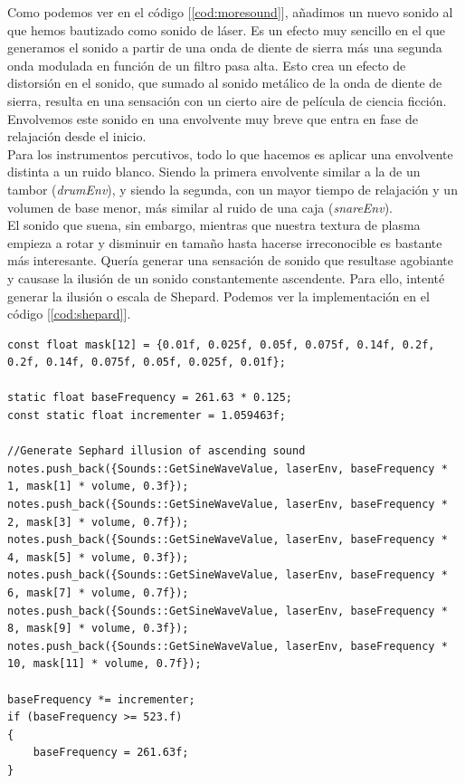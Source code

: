 Como podemos ver en el código [\ref{cod:moresound}], añadimos un nuevo sonido al que hemos bautizado como sonido de láser. Es un efecto muy sencillo en el que generamos el sonido a partir de una onda de diente de sierra más una segunda onda modulada en función de un filtro pasa alta. Esto crea un efecto de distorsión en el sonido, que sumado al sonido metálico de la onda de diente de sierra, resulta en una sensación con un cierto aire de película de ciencia ficción. Envolvemos este sonido en una envolvente muy breve que entra en fase de relajación desde el inicio.\\

Para los instrumentos percutivos, todo lo que hacemos es aplicar una envolvente distinta a un ruido blanco. Siendo la primera envolvente similar a la de un tambor (\emph{drumEnv}), y siendo la segunda, con un mayor tiempo de relajación y un volumen de base menor, más similar al ruido de una caja (\emph{snareEnv}).\\

El sonido que suena, sin embargo, mientras que nuestra textura de plasma empieza a rotar y disminuir en tamaño hasta hacerse irreconocible es bastante más interesante. Quería generar una sensación de sonido que resultase agobiante y causase la ilusión de un sonido constantemente ascendente. Para ello, intenté generar la ilusión o escala de Shepard. Podemos ver la implementación en el código [\ref{cod:shepard}].

\begin{lstlisting}[style=C-color, caption={Generación de la escala de Shepard},label=cod:shepard]
const float mask[12] = {0.01f, 0.025f, 0.05f, 0.075f, 0.14f, 0.2f, 0.2f, 0.14f, 0.075f, 0.05f, 0.025f, 0.01f};

static float baseFrequency = 261.63 * 0.125;
const static float incrementer = 1.059463f;

//Generate Sephard illusion of ascending sound
notes.push_back({Sounds::GetSineWaveValue, laserEnv, baseFrequency * 1, mask[1] * volume, 0.3f});
notes.push_back({Sounds::GetSineWaveValue, laserEnv, baseFrequency * 2, mask[3] * volume, 0.7f});
notes.push_back({Sounds::GetSineWaveValue, laserEnv, baseFrequency * 4, mask[5] * volume, 0.3f});
notes.push_back({Sounds::GetSineWaveValue, laserEnv, baseFrequency * 6, mask[7] * volume, 0.7f});
notes.push_back({Sounds::GetSineWaveValue, laserEnv, baseFrequency * 8, mask[9] * volume, 0.3f});
notes.push_back({Sounds::GetSineWaveValue, laserEnv, baseFrequency * 10, mask[11] * volume, 0.7f});

baseFrequency *= incrementer;
if (baseFrequency >= 523.f)
{
	baseFrequency = 261.63f;
}
\end{lstlisting}

